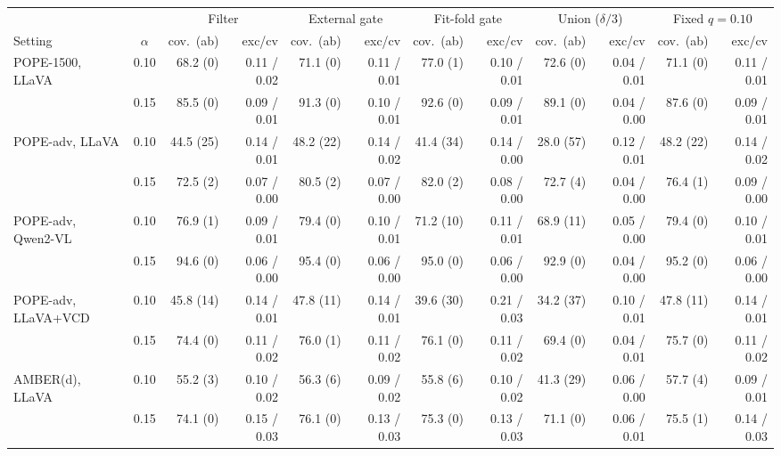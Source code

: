 \begin{tabular}{lcrrrrrrrrrr}
\toprule
 & & \multicolumn{2}{c}{Filter} & \multicolumn{2}{c}{External gate} & \multicolumn{2}{c}{Fit-fold gate} & \multicolumn{2}{c}{Union ($\delta/3$)} & \multicolumn{2}{c}{Fixed $q{=}0.10$}\\
\cmidrule(lr){3-4}\cmidrule(lr){5-6}\cmidrule(lr){7-8}\cmidrule(lr){9-10}\cmidrule(lr){11-12}
Setting & $\alpha$ & cov.\ (ab) & exc/cv & cov.\ (ab) & exc/cv & cov.\ (ab) & exc/cv & cov.\ (ab) & exc/cv & cov.\ (ab) & exc/cv\\
\midrule
POPE-1500, LLaVA & 0.10 & 68.2 (0) & 0.11 / 0.02 & 71.1 (0) & 0.11 / 0.01 & 77.0 (1) & 0.10 / 0.01 & 72.6 (0) & 0.04 / 0.01 & 71.1 (0) & 0.11 / 0.01\\
 & 0.15 & 85.5 (0) & 0.09 / 0.01 & 91.3 (0) & 0.10 / 0.01 & 92.6 (0) & 0.09 / 0.01 & 89.1 (0) & 0.04 / 0.00 & 87.6 (0) & 0.09 / 0.01\\
\addlinespace
POPE-adv, LLaVA & 0.10 & 44.5 (25) & 0.14 / 0.01 & 48.2 (22) & 0.14 / 0.02 & 41.4 (34) & 0.14 / 0.00 & 28.0 (57) & 0.12 / 0.01 & 48.2 (22) & 0.14 / 0.02\\
 & 0.15 & 72.5 (2) & 0.07 / 0.00 & 80.5 (2) & 0.07 / 0.00 & 82.0 (2) & 0.08 / 0.00 & 72.7 (4) & 0.04 / 0.00 & 76.4 (1) & 0.09 / 0.00\\
\addlinespace
POPE-adv, Qwen2-VL & 0.10 & 76.9 (1) & 0.09 / 0.01 & 79.4 (0) & 0.10 / 0.01 & 71.2 (10) & 0.11 / 0.01 & 68.9 (11) & 0.05 / 0.00 & 79.4 (0) & 0.10 / 0.01\\
 & 0.15 & 94.6 (0) & 0.06 / 0.00 & 95.4 (0) & 0.06 / 0.00 & 95.0 (0) & 0.06 / 0.00 & 92.9 (0) & 0.04 / 0.00 & 95.2 (0) & 0.06 / 0.00\\
\addlinespace
POPE-adv, LLaVA+VCD & 0.10 & 45.8 (14) & 0.14 / 0.01 & 47.8 (11) & 0.14 / 0.01 & 39.6 (30) & 0.21 / 0.03 & 34.2 (37) & 0.10 / 0.01 & 47.8 (11) & 0.14 / 0.01\\
 & 0.15 & 74.4 (0) & 0.11 / 0.02 & 76.0 (1) & 0.11 / 0.02 & 76.1 (0) & 0.11 / 0.02 & 69.4 (0) & 0.04 / 0.01 & 75.7 (0) & 0.11 / 0.02\\
\addlinespace
AMBER(d), LLaVA & 0.10 & 55.2 (3) & 0.10 / 0.02 & 56.3 (6) & 0.09 / 0.02 & 55.8 (6) & 0.10 / 0.02 & 41.3 (29) & 0.06 / 0.00 & 57.7 (4) & 0.09 / 0.01\\
 & 0.15 & 74.1 (0) & 0.15 / 0.03 & 76.1 (0) & 0.13 / 0.03 & 75.3 (0) & 0.13 / 0.03 & 71.1 (0) & 0.06 / 0.01 & 75.5 (1) & 0.14 / 0.03\\
\bottomrule
\end{tabular}

